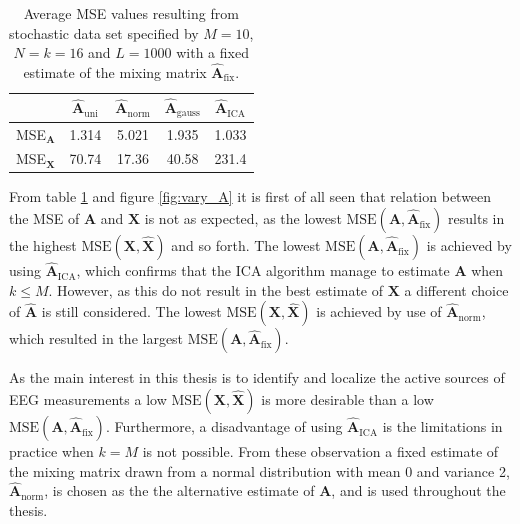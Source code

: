 \begin{table}[H]
\centering
\begin{tabular}{|c|c|c|c|c|}
\hline
 & $\hat{\mathbf{A}}_{\text{uni}}$ & $\hat{\mathbf{A}}_{\text{norm}}$	 & $\hat{\mathbf{A}}_{\text{gauss}}$ & $\hat{\mathbf{A}}_{\text{ICA}}$ \\
\hline
MSE$_\mathbf{A}$ & 1.314 & 5.021 & 1.935 & 1.033 \\
\hline
MSE$_\mathbf{X}$ & 70.74 & 17.36 & 40.58 & 231.4 \\
\hline
\end{tabular}
\caption{Average MSE values resulting from stochastic data set specified by $M=10$, $N=k=16$ and $L=1000$ with a fixed estimate of the mixing matrix $\hat{\mathbf{A}}_{\text{fix}}$.}
\label{tab:fixed}
\end{table}
\noindent
From table \ref{tab:fixed} and figure \ref{fig:vary_A} it is first of all seen that relation between the MSE of $\textbf{A}$ and $\textbf{X}$ is not as expected, as the lowest $\text{MSE}(\mathbf{A}, \hat{\mathbf{A}}_{\text{fix}})$ results in the highest $\text{MSE}(\mathbf{X}, \hat{\mathbf{X}})$ and so forth. 
The lowest $\text{MSE}(\mathbf{A}, \hat{\mathbf{A}}_{\text{fix}})$ is achieved by using $\hat{\mathbf{A}}_{\text{ICA}}$, which confirms that the ICA algorithm manage to estimate $\mathbf{A}$ when $k \leq M$. 
However, as this do not result in the best estimate of $\mathbf{X}$ a different choice of $\hat{\mathbf{A}}$ is still considered. 
The lowest $\text{MSE}(\mathbf{X}, \hat{\mathbf{X}})$ is achieved by use of $\hat{\mathbf{A}}_{\text{norm}}$, which resulted in the largest $\text{MSE}(\mathbf{A}, \hat{\mathbf{A}}_{\text{fix}})$. 
      
As the main interest in this thesis is to identify and localize the active sources of EEG measurements a low $\text{MSE}(\mathbf{X}, \hat{\mathbf{X}})$ is more desirable than a low $\text{MSE}(\mathbf{A}, \hat{\mathbf{A}}_{\text{fix}})$. 
Furthermore, a disadvantage of using $\hat{\mathbf{A}}_{\text{ICA}}$ is the limitations in practice when $k = M$ is not possible.     
From these observation a fixed estimate of the mixing matrix drawn from a normal distribution with mean 0 and variance 2, $\hat{\mathbf{A}}_{\text{norm}}$, is chosen as the the alternative estimate of $\mathbf{A}$, and is used throughout the thesis. 
